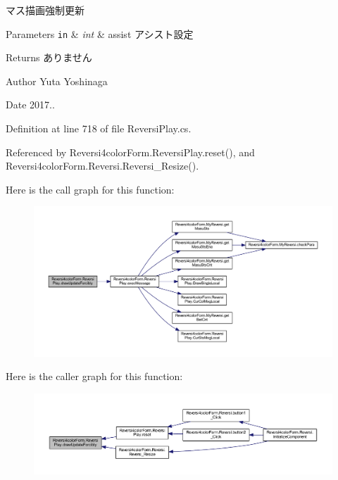 マス描画強制更新 


\begin{DoxyParams}[1]{Parameters}
\mbox{\tt in}  & {\em int} & assist アシスト設定 \\
\hline
\end{DoxyParams}
\begin{DoxyReturn}{Returns}
ありません 
\end{DoxyReturn}
\begin{DoxyAuthor}{Author}
Yuta Yoshinaga 
\end{DoxyAuthor}
\begin{DoxyDate}{Date}
2017.. 
\end{DoxyDate}


Definition at line 718 of file Reversi\+Play.\+cs.



Referenced by Reversi4color\+Form.\+Reversi\+Play.\+reset(), and Reversi4color\+Form.\+Reversi.\+Reversi\+\_\+\+Resize().

Here is the call graph for this function\+:
\nopagebreak
\begin{figure}[H]
\begin{center}
\leavevmode
\includegraphics[width=350pt]{class_reversi4color_form_1_1_reversi_play_a0ef55faf321fa98d44baad4f25ae6940_cgraph}
\end{center}
\end{figure}
Here is the caller graph for this function\+:
\nopagebreak
\begin{figure}[H]
\begin{center}
\leavevmode
\includegraphics[width=350pt]{class_reversi4color_form_1_1_reversi_play_a0ef55faf321fa98d44baad4f25ae6940_icgraph}
\end{center}
\end{figure}
\mbox{\label{class_reversi4color_form_1_1_reversi_play_a3e9c0923815d7270ae73c88ff57244d4}} 
